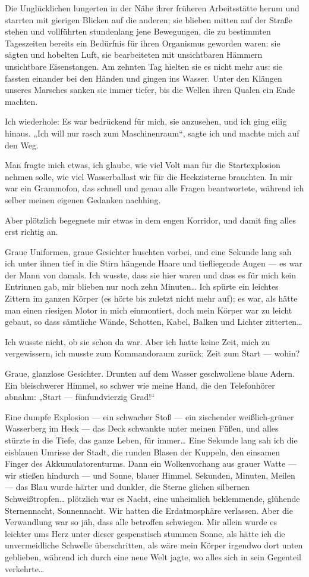 Die Unglücklichen lungerten in der Nähe ihrer früheren
Arbeitsstätte herum und starrten mit gierigen Blicken auf die
anderen; sie blieben mitten auf der Straße stehen und vollführten
stundenlang jene Bewegungen, die zu bestimmten Tageszeiten bereits
ein Bedürfnis für ihren Organismus geworden waren: sie sägten und
hobelten Luft, sie bearbeiteten mit unsichtbaren Hämmern
unsichtbare Eisenstangen. Am zehnten Tag hielten sie es nicht mehr
aus: sie fassten einander bei den Händen und gingen ins Wasser.
Unter den Klängen unseres Marsches sanken sie immer tiefer, bis die
Wellen ihren Qualen ein Ende machten.

Ich wiederhole: Es war bedrückend für mich, sie anzusehen, und ich
ging eilig hinaus. „Ich will nur rasch zum Maschinenraum“, sagte
ich und machte mich auf den Weg.

Man fragte mich etwas, ich glaube, wie viel Volt man für die
Startexplosion nehmen solle, wie viel Wasserballast
wir für die Heckzisterne brauchten. In mir war ein Grammofon, das
schnell und genau alle Fragen beantwortete, während ich selber
meinen eigenen Gedanken nachhing.

Aber plötzlich begegnete mir
etwas in dem engen Korridor, und damit fing alles erst richtig an.

Graue Uniformen, graue Gesichter huschten vorbei, und eine Sekunde
lang sah ich unter ihnen tief in die Stirn hängende Haare und
tiefliegende Augen — es war der Mann von damals. Ich wusste, dass
sie hier waren und dass es für mich kein Entrinnen gab, mir blieben
nur noch zehn Minuten\ldots{} Ich spürte ein leichtes Zittern im ganzen
Körper (es hörte bis zuletzt nicht mehr auf); es war, als hätte man
einen riesigen Motor in mich einmontiert, doch mein Körper war zu
leicht gebaut, so dass sämtliche Wände, Schotten, Kabel, Balken und
Lichter zitterten\ldots{}

Ich wusste nicht, ob sie schon da war. Aber
ich hatte keine Zeit, mich zu vergewissern, ich musste zum
Kommandoraum zurück; Zeit zum Start — wohin?

Graue, glanzlose
Gesichter. Drunten auf dem Wasser geschwollene blaue Adern. Ein
bleischwerer Himmel, so schwer wie meine Hand, die den Telefonhörer
abnahm: „Start — fünfundvierzig Grad!“

Eine dumpfe Explosion — ein schwacher Stoß — ein zischender
weißlich-grüner Wasserberg im Heck — das Deck schwankte unter
meinen Füßen, und alles stürzte in die Tiefe, das ganze Leben, für
immer\ldots{} Eine Sekunde lang sah ich die eisblauen Umrisse der Stadt,
die runden Blasen der Kuppeln, den einsamen Finger des
Akkumulatorenturms. Dann ein Wolkenvorhang aus grauer Watte — wir
stießen hindurch — und Sonne, blauer Himmel. Sekunden, Minuten,
Meilen — das Blau wurde härter und dunkler, die Sterne glichen
silbernen Schweißtropfen\ldots{}
%
plötzlich war es Nacht, eine unheimlich beklemmende, glühende
Sternennacht, Sonnennacht. Wir hatten die Erdatmosphäre verlassen.
Aber die Verwandlung war so jäh, dass alle betroffen schwiegen. Mir
allein wurde es leichter ums Herz unter dieser gespenstisch stummen
Sonne, als hätte ich die unvermeidliche Schwelle überschritten, als
wäre mein Körper irgendwo dort unten geblieben, während ich durch
eine neue Welt jagte, wo alles sich in sein Gegenteil verkehrte\ldots{}

